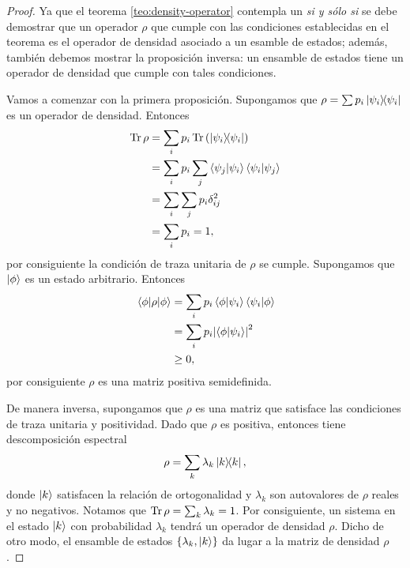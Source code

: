 \begin{proof}
	Ya que el teorema \ref{teo:density-operator} contempla un \textit{si
	y sólo si} se debe demostrar que un operador $\rho$ que cumple con 
	las condiciones establecidas en el teorema es el operador 
	de densidad asociado a un esamble de estados; además, también debemos
	mostrar la proposición inversa: un ensamble de estados
	tiene un operador de densidad que cumple con tales condiciones.
	
	Vamos a comenzar con la primera proposición. 
	Supongamos que $\rho = \sum p_i\dyad{\psii}{\psii}$ es un operador de
	densidad. Entonces 
	\begin{align*}
		\Tr \rho &= \sum _i p_i\Tr \qty(\dyad{\psii}{\psii})\\
		&= \sum _i p_i \sum _j \braket{\psi_j}{\psii}\braket{\psii}{\psi_j}\\
		&=\sum _i \sum _j p_i \delta _{ij}^2\\
		&=\sum _i p_i=1,
	\end{align*}
	por consiguiente la condición de traza unitaria de $\rho$ se cumple. 
	Supongamos que $\ket{\phi}$ es un estado arbitrario. Entonces
	\begin{align*}
		\matrixel{\phi}{\rho}{\phi} &= \sum _i p_i \braket{\phi}{\psii}
		\braket{\psii}{\phi} \\
		&=\sum _i p_i \abs{\braket{\phi}{\psii}}^2\\
		&\geq 0,
	\end{align*}
	por consiguiente $\rho$ es una matriz positiva semidefinida. 
 	
 	De manera inversa,
 	supongamos que $\rho$ es una matriz que satisface las condiciones
	de traza unitaria y positividad. Dado que $\rho$ es positiva, entonces
	tiene descomposición espectral \cite{nielsen_chuang_2011} 
	\begin{align*}
		\rho = \sum _k \lambda _k \dyad{k}{k},
	\end{align*}
	donde $\ket{k}$ satisfacen la relación de ortogonalidad y $\lambda _k$ son
	autovalores de $\rho$ reales y no negativos. Notamos que $\Tr \rho = \sum _k
	\lambda _k = 1$. Por consiguiente, un sistema en el estado $\ket{k}$ con 
	probabilidad $\lambda_k$ tendrá un operador de densidad $\rho$. Dicho 
	de otro modo, el ensamble de estados $\{ \lambda_k,\ket{k}\}$ 
	da lugar a la matriz de densidad $\rho$. 
\end{proof}

